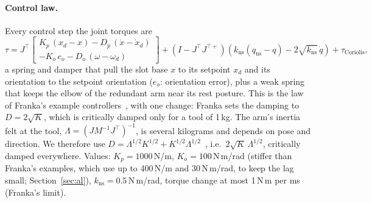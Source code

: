 \paragraph{Control law.} Every control step the joint torques are
\begin{equation}
  \tau = J^\top \begin{bmatrix} K_p\,(x_d - x) - D_p\,(\dot x - \dot x_d) \\
                                 -K_o\,e_o - D_o\,(\omega - \omega_d) \end{bmatrix}
       + \left(I - J^\top J^{\top+}\right)\left(k_\text{ns}(q_\text{ns} - q) - 2\sqrt{k_\text{ns}}\,\dot q\right)
       + \tau_\text{Coriolis},
  \label{eq:impedance}
\end{equation}
a spring and damper that pull the slot base $x$ to its setpoint $x_d$ and its orientation to the setpoint orientation
($e_o$: orientation error), plus a weak spring that keeps the elbow of the redundant arm near its rest posture. This is the law of
Franka's example controllers~\cite{libfranka,frankaros}, with one change: Franka sets the damping to
$D = 2\sqrt{K}$, which is critically damped only for a tool of 1\,kg. The arm's inertia felt at the tool,
$\Lambda = (J M^{-1} J^\top)^{-1}$, is several kilograms and depends on pose and direction. We therefore use
$D = \Lambda^{1/2} K^{1/2} + K^{1/2} \Lambda^{1/2}$~\cite{albu2003cartesian}, i.e.\ $2\sqrt{K}\,\Lambda^{1/2}$,
critically damped everywhere. Values: $K_p = 1000$\,N/m, $K_o = 100$\,N\,m/rad (stiffer than Franka's examples,
which use up to 400\,N/m and 30\,N\,m/rad, to keep the lag small; Section~\ref{sec:al}), $k_\text{ns} = 0.5$\,N\,m/rad,
torque change at most 1\,N\,m per ms (Franka's limit).

